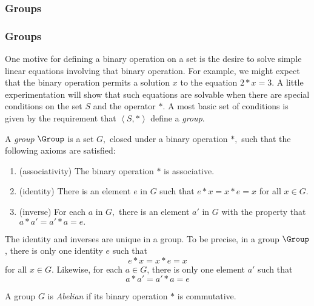 {\subsubsection{Groups}}
{\subsubsection{Groups\protect\footnotemark}
}
One motive for defining a binary operation on a set is the desire to
solve simple linear equations involving that binary operation.  For
example, we might expect that the binary operation permits a solution
$x$ to the equation $2 * x = 3.$  A little experimentation will show
that such equations are solvable when there are special conditions on
the set $S$ and the operator $*$.  A most basic set of conditions is
given by the requirement that $\left<S,*\right>$ define a
\emph{group}.
\begin{definition}[Group]
\label{def:group}
A \emph{group} 
$\Group$
is a set $G,$ closed under a binary
operation $*,$ such that the following axioms are satisfied:
\begin{enumerate}
\item (associativity) The binary operation $*$ is associative.
\item (identity) There is an element $e$ in $G$ such that $e*x = x*e = x$ for all
$x \in G.$
\item (inverse) For each $a$ in $G,$ there is an element $a'$ in $G$
with the property that $a*a' = a'*a = e.$
\end{enumerate}
\end{definition}
\begin{theorem}
The identity and inverses are unique in a group.  To be precise, in a
group $\Group$, there is only one identity $e$ such that 
\[
e * x = x * e = x
\]
for all $x\in G$. Likewise, for each $a\in G$, there is only one
element $a'$ such that 
\[
a * a' = a' * a = e
\]
\end{theorem}
\begin{definition}
A group $G$ is \emph{Abelian} if its binary operation $*$ is commutative.
\end{definition}

